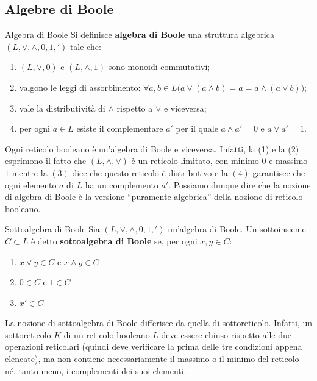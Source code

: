 \subsection{Algebre di Boole}
\begin{defbox}{Algebra di Boole}
	Si definisce \textbf{algebra di Boole} una struttura algebrica $(L,\vee,\wedge,0,1,')$ tale che:
	\begin{enumerate}
		\item $(L,\vee,0)$ e $(L,\wedge,1)$ sono monoidi commutativi;
		\item valgono le leggi di assorbimento: $\forall a,b \in L \bigl(a \vee(a \wedge b)=a=a\wedge(a \vee b)\bigr)$;
		\item vale la distributività di $\wedge$ rispetto a $\vee$ e viceversa;
		\item per ogni $a \in L$ esiste il complementare $a'$ per il quale $a \wedge a' = 0$ e $a \vee a'=1$.
	\end{enumerate}
	
\end{defbox}

\begin{osservation}
	Ogni reticolo booleano è un'algebra di Boole e viceversa. Infatti, la (1) e la (2) esprimono il fatto che $(L,\wedge,\vee)$ è un reticolo limitato, con minimo $0$ e massimo $1$ mentre la $(3)$ dice che questo reticolo è distributivo e la $(4)$ garantisce che ogni elemento $a$ di $L$ ha un complemento $a'$. Possiamo dunque dire che la nozione di algebra di Boole è la versione ``puramente algebrica'' della nozione di reticolo booleano.
\end{osservation}

\begin{defbox}{Sottoalgebra di Boole}
	Sia $(L,\vee,\wedge,0,1,')$ un'algebra di Boole. Un sottoinsieme $C \subset L$ è detto \textbf{sottoalgebra di Boole} se, per ogni $x,y \in C$:
	\begin{enumerate}
		\item $x \vee y \in C$ e $x \wedge y \in C$
		\item $0 \in C$ e $1 \in C$
		\item $x' \in C$
	\end{enumerate}
\end{defbox}

La nozione di sottoalgebra di Boole differisce da quella di sottoreticolo. Infatti, un sottoreticolo $K$ di un reticolo booleano $L$ deve essere chiuso rispetto alle due operazioni reticolari (quindi deve verificare la prima delle tre condizioni appena elencate), ma non contiene necessariamente il massimo o il minimo del reticolo né, tanto meno, i complementi dei suoi elementi.


